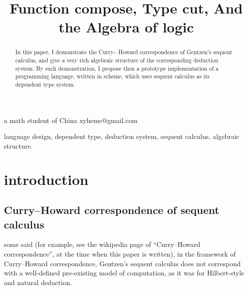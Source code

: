 \documentclass{sigplanconf}
\begin{document}
\setlength{\pdfpageheight}{\paperheight}
\setlength{\pdfpagewidth}{\paperwidth}



\title{Function compose, Type cut, And the Algebra of logic}
 {a math student of China} {xyheme@gmail.com}
\maketitle

\begin{abstract}
  In this paper, I demonstrate the Curry-–Howard correspondence of Gentzen's sequent calculus,
  and give a very rich algebraic structure of the corresponding deduction system.
  By such demonstration, I propose then a prototype implementation of a programming language, written in scheme, which uses sequent calculus as its dependent type system.
\end{abstract}


\keywords
language design,
dependent type,
deduction system,
sequent calculus,
algebraic structure.

\section{introduction}

\subsection{Curry--Howard correspondence of sequent calculus}

some said (for example, see the wikipedia page of ``Curry--Howard correspondence'', at the time when this paper is written),
in the framework of Curry--Howard correspondence,
Gentzen's sequent calculus does not correspond with
a well-defined pre-existing model of computation,
as it was for Hilbert-style and natural deduction.
\end{document}
